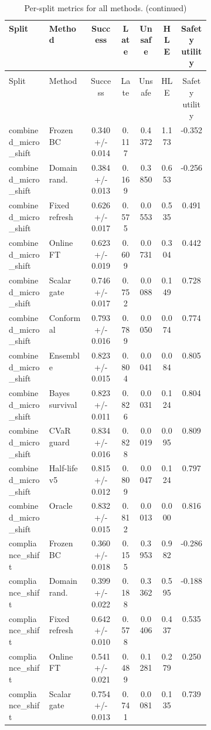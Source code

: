 \documentclass{article}
\begin{document}
\begin{center}
\scriptsize
\begin{longtable}{p{0.20\linewidth}p{0.20\linewidth}ccccc}
\caption{Per-split metrics for all methods.}\label{tab:split-metrics}\\
\toprule
Split & Method & Success & Late & Unsafe & HLE & Safety utility\\
\midrule
\endfirsthead
\caption[]{Per-split metrics for all methods. (continued)}\\
\toprule
Split & Method & Success & Late & Unsafe & HLE & Safety utility\\
\midrule
\endhead
combined\_micro\_shift & Frozen BC & 0.340 +/- 0.014 & 0.117 & 0.4372 & 1.173 & -0.352\\
combined\_micro\_shift & Domain rand. & 0.384 +/- 0.013 & 0.169 & 0.3850 & 0.653 & -0.256\\
combined\_micro\_shift & Fixed refresh & 0.626 +/- 0.017 & 0.575 & 0.0553 & 0.535 & 0.491\\
combined\_micro\_shift & Online FT & 0.623 +/- 0.019 & 0.609 & 0.0731 & 0.304 & 0.442\\
combined\_micro\_shift & Scalar gate & 0.746 +/- 0.017 & 0.752 & 0.0088 & 0.149 & 0.728\\
combined\_micro\_shift & Conformal & 0.793 +/- 0.016 & 0.789 & 0.0050 & 0.074 & 0.774\\
combined\_micro\_shift & Ensemble & 0.823 +/- 0.015 & 0.804 & 0.0041 & 0.084 & 0.805\\
combined\_micro\_shift & Bayes survival & 0.823 +/- 0.011 & 0.826 & 0.0031 & 0.124 & 0.804\\
combined\_micro\_shift & CVaR guard & 0.834 +/- 0.016 & 0.828 & 0.0019 & 0.095 & 0.809\\
combined\_micro\_shift & Half-life v5 & 0.815 +/- 0.012 & 0.809 & 0.0047 & 0.124 & 0.797\\
combined\_micro\_shift & Oracle & 0.832 +/- 0.015 & 0.812 & 0.0013 & 0.000 & 0.816\\
compliance\_shift & Frozen BC & 0.360 +/- 0.018 & 0.155 & 0.3953 & 0.982 & -0.286\\
compliance\_shift & Domain rand. & 0.399 +/- 0.022 & 0.188 & 0.3362 & 0.595 & -0.188\\
compliance\_shift & Fixed refresh & 0.642 +/- 0.010 & 0.578 & 0.0406 & 0.437 & 0.535\\
compliance\_shift & Online FT & 0.541 +/- 0.021 & 0.489 & 0.1281 & 0.279 & 0.250\\
compliance\_shift & Scalar gate & 0.754 +/- 0.013 & 0.741 & 0.0081 & 0.135 & 0.739\\

\end{longtable}
\end{center}
\end{document}
